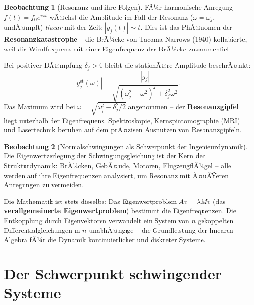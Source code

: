 ﻿\documentclass[a4paper,12pt]{report}
\theoremstyle{definition}
\newtheorem{beobachtung}{Beobachtung}
\begin{document}
\begin{beobachtung}[Resonanz und ihre Folgen]
    FÃ¼r harmonische Anregung $f(t) = f_0 e^{i\omega t}$ wÃ¤chst die
    Amplitude im Fall der Resonanz ($\omega = \omega_j$, undÃ¤mpft)
    \emph{linear} mit der Zeit: $|y_j(t)| \sim t$. Dies ist das
    PhÃ¤nomen der \textbf{Resonanzkatastrophe} -- die BrÃ¼cke von Tacoma
    Narrows (1940) kollabierte, weil die Windfrequenz mit einer
    Eigenfrequenz der BrÃ¼cke zusammenfiel.

    Bei positiver DÃ¤mpfung $\delta_j > 0$ bleibt die stationÃ¤re
    Amplitude beschrÃ¤nkt:
    \[
        |y_j^\mathrm{st}(\omega)| = \frac{|g_j|}{\sqrt{(\omega_j^2 - \omega^2)^2
        + \delta_j^2 \omega^2}}.
    \]
    Das Maximum wird bei $\omega = \sqrt{\omega_j^2 - \delta_j^2/2}$
    angenommen -- der \textbf{Resonanzgipfel} liegt unterhalb der
    Eigenfrequenz. Spektroskopie, Kernspintomographie (MRI) und
    Lasertechnik beruhen auf dem prÃ¤zisen Ausnutzen von Resonanzgipfeln.
\end{beobachtung}

\begin{beobachtung}[Normalschwingungen als Schwerpunkt der Ingenieurdynamik]
    Die Eigenwertzerlegung der Schwingungsgleichung ist der Kern der
    Strukturdynamik: BrÃ¼cken, GebÃ¤ude, Motoren, FlugzeugflÃ¼gel --
    alle werden auf ihre Eigenfrequenzen analysiert, um Resonanz mit
    Ã¤uÃŸeren Anregungen zu vermeiden.

    Die Mathematik ist stets dieselbe: Das Eigenwertproblem $Av = \lambda Mv$
    (das \textbf{verallgemeinerte Eigenwertproblem}) bestimmt die
    Eigenfrequenzen. Die Entkopplung durch Eigenvektoren verwandelt
    ein System von $n$ gekoppelten Differentialgleichungen in $n$
    unabhÃ¤ngige -- die Grundleistung der linearen Algebra fÃ¼r die
    Dynamik kontinuierlicher und diskreter Systeme.
\end{beobachtung}


\section{Der Schwerpunkt schwingender Systeme}
\end{document}
